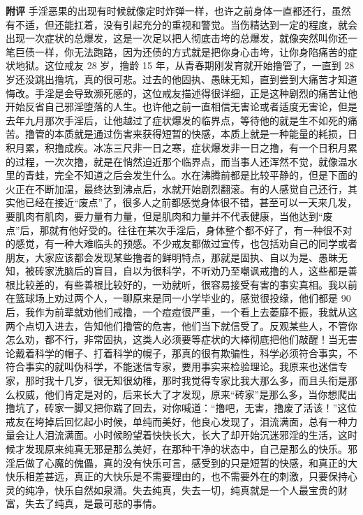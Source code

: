 \begin{case}
    \textbf{附评} 手淫恶果的出现有时候就像定时炸弹一样，也许之前身体一直都还行，虽然有不适，但还能扛着，没有引起充分的重视和警觉。当伤精达到一定的程度，就会出现一次症状的总爆发，这是一次足以把人彻底击垮的总爆发，就像突然叫你还一笔巨债一样，你无法跑路，因为还债的方式就是把你身心击垮，让你身陷痛苦的症状地狱。这位戒友 28 岁，撸龄 15 年，从青春期刚发育就开始撸管了，一直到 28 岁还没跳出撸坑，真的很可悲。过去的他固执、愚昧无知，直到尝到大痛苦才知道悔改。手淫是会导致濒死感的，这位戒友描述得很详细，正是这种剧烈的痛苦让他开始反省自己邪淫堕落的人生。也许他之前一直相信无害论或者适度无害论，但是去年九月那次手淫后，让他越过了症状爆发的临界点，等待他的就是生不如死的痛苦。撸管的本质就是通过伤害来获得短暂的快感，本质上就是一种能量的耗损，日积月累，积撸成疾。冰冻三尺非一日之寒，症状爆发非一日之撸，有一个日积月累的过程，一次次撸，就是在悄然迫近那个临界点，而当事人还浑然不觉，就像温水里的青蛙，完全不知道之后会发生什么。水在沸腾前都是比较平静的，但是下面的火正在不断加温，最终达到沸点后，水就开始剧烈翻滚。有的人感觉自己还行，其实他已经在接近“废点”了，很多人之前都感觉身体很不错，甚至可以一天来几发，要肌肉有肌肉，要力量有力量，但是肌肉和力量并不代表健康，当他达到“废点”后，那就有他好受的。往往在某次手淫后，身体整个都不好了，有一种很不对的感觉，有一种大难临头的预感。不少戒友都做过宣传，也包括劝自己的同学或者朋友，大家应该都会发现某些撸者的鲜明特点，那就是固执、自以为是、愚昧无知，被砖家洗脑后的盲目，自以为很科学，不听劝乃至嘲讽戒撸的人，这些都是善根比较差的，有些善根比较好的，一劝就听，很容易接受有害的事实真相。我以前在篮球场上劝过两个人，一聊原来是同一小学毕业的，感觉很投缘，他们都是 90 后，我作为前辈就劝他们戒撸，一个痘痘很严重，一个看上去萎靡不振，我就从这两个点切入进去，告知他们撸管的危害，他们当下就信受了。反观某些人，不管你怎么劝，都不行，非常固执，这类人必须要等症状的大棒彻底把他们敲醒！当无害论戴着科学的帽子、打着科学的幌子，那真的很有欺骗性，科学必须符合事实，不符合事实的就叫伪科学，不能迷信专家，要用事实来检验理论。我原来也迷信专家，那时我十几岁，很无知很幼稚，那时我觉得专家比我大那么多，而且头衔是那么权威，他们肯定是对的，后来长大了才发现，原来“砖家”是那么多，当你想爬出撸坑了，砖家一脚又把你踹了回去，对你喊道：“撸吧，无害，撸废了活该！”这位戒友在垮掉后回忆起小时候，单纯而美好，他良心发现了，泪流满面，总有一种力量会让人泪流满面。小时候盼望着快快长大，长大了却开始沉迷邪淫的生活，这时候才发现原来纯真无邪是那么美好，在那种干净的状态中，自己是那么的快乐。邪淫后做了心魔的傀儡，真的没有快乐可言，感受到的只是短暂的快感，和真正的大快乐相差甚远，真正的大快乐是不需要理由的，也不需要外在的刺激，只要保持心灵的纯净，快乐自然如泉涌。失去纯真，失去一切，纯真就是一个人最宝贵的财富，失去了纯真，是最可悲的事情。
\end{case}

